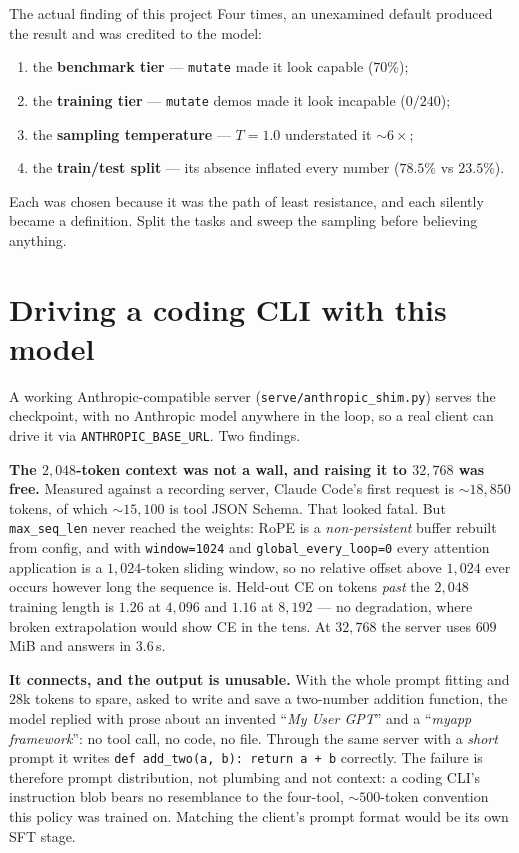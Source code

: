 \documentclass[10pt,a4paper]{article}
\newcommand{\code}[1]{\texttt{\small #1}}
\begin{document}
\begin{retraction}{The actual finding of this project}
Four times, an unexamined default produced the result and was credited to the
model:
\begin{enumerate}
\item the \textbf{benchmark tier} --- \code{mutate} made it look capable ($70\%$);
\item the \textbf{training tier} --- \code{mutate} demos made it look incapable ($0/240$);
\item the \textbf{sampling temperature} --- $T{=}1.0$ understated it ${\sim}6\times$;
\item the \textbf{train/test split} --- its absence inflated every number ($78.5\%$ vs $23.5\%$).
\end{enumerate}
Each was chosen because it was the path of least resistance, and each silently
became a definition. Split the tasks and sweep the sampling before believing
anything.
\end{retraction}

\section{Driving a coding CLI with this model}

A working Anthropic-compatible server (\code{serve/anthropic\_shim.py}) serves
the checkpoint, with no Anthropic model anywhere in the loop, so a real client
can drive it via \code{ANTHROPIC\_BASE\_URL}. Two findings.

\medskip\noindent\textbf{The $2{,}048$-token context was not a wall, and
raising it to $32{,}768$ was free.} Measured against a recording server, Claude
Code's first request is ${\sim}18{,}850$ tokens, of which ${\sim}15{,}100$ is
tool JSON Schema. That looked fatal. But \code{max\_seq\_len} never reached the
weights: RoPE is a \emph{non-persistent} buffer rebuilt from config, and with
\code{window=1024} and \code{global\_every\_loop=0} every attention application
is a $1{,}024$-token sliding window, so no relative offset above $1{,}024$ ever
occurs however long the sequence is. Held-out CE on tokens \emph{past} the
$2{,}048$ training length is $1.26$ at $4{,}096$ and $1.16$ at $8{,}192$ ---
no degradation, where broken extrapolation would show CE in the tens. At
$32{,}768$ the server uses $609$\,MiB and answers in $3.6$\,s.

\medskip\noindent\textbf{It connects, and the output is unusable.} With the
whole prompt fitting and $28$k tokens to spare, asked to write and save a
two-number addition function, the model replied with prose about an invented
``\emph{My User GPT}'' and a ``\emph{myapp framework}'': no tool call, no code,
no file. Through the same server with a \emph{short} prompt it writes
\code{def add\_two(a, b): return a + b} correctly. The failure is therefore
prompt distribution, not plumbing and not context: a coding CLI's instruction
blob bears no resemblance to the four-tool, ${\sim}500$-token convention this
policy was trained on. Matching the client's prompt format would be its own
SFT stage.
\end{document}
